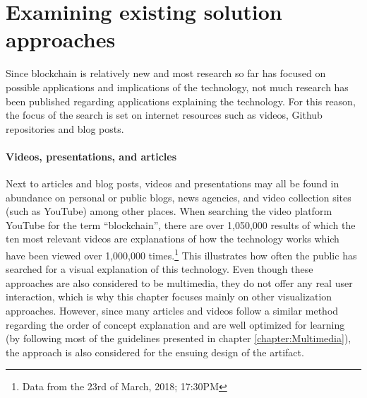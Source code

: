 \section{Examining existing solution approaches} \label{sec:ExistingSolutions}

Since blockchain is relatively new and most research so far has focused on possible applications and implications of the technology, not much research has been published regarding applications explaining the technology. For this reason, the focus of the search is set on internet resources such as videos, Github repositories and blog posts. 

\paragraph{Videos, presentations, and articles} Next to articles and blog posts, videos and presentations may all be found in abundance on personal or public blogs, news agencies, and video collection sites (such as YouTube) among other places. When searching the video platform YouTube for the term \enquote{blockchain}, there are over 1,050,000 results of which the ten most relevant videos are explanations of how the technology works which have been viewed over 1,000,000 times.\footnote{Data from the 23rd of March, 2018; 17:30PM} This illustrates how often the public has searched for a visual explanation of this technology. Even though these approaches are also considered to be multimedia, they do not offer any real user interaction, which is why this chapter focuses mainly on other visualization approaches. However, since many articles and videos follow a similar method regarding the order of concept explanation and are well optimized for learning (by following most of the guidelines presented in chapter \ref{chapter:Multimedia}), the approach is also considered for the ensuing design of the artifact.

